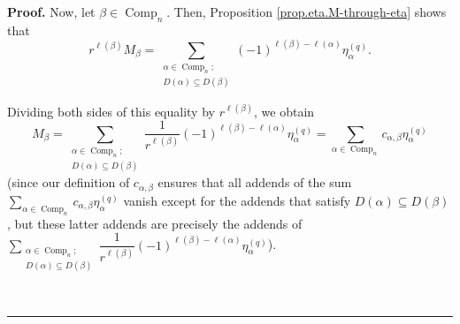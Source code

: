 \documentclass[numbers=enddot,12pt,final,onecolumn,notitlepage]{scrartcl}%
\theoremstyle{definition}
\newenvironment{proof}[1][Proof]{\noindent\textbf{#1.} }{\ \rule{0.5em}{0.5em}}
\let\sumnonlimits\sum
\renewcommand{\sum}{\sumnonlimits\limits}
\newenvironment{vershort}{}{}
\begin{document}
\begin{proof}
Now, let $\beta\in\operatorname*{Comp}\nolimits_{n}$. Then, Proposition
\ref{prop.eta.M-through-eta} shows that%
\begin{equation}
r^{\ell\left(  \beta\right)  }M_{\beta}=\sum_{\substack{\alpha\in
\operatorname*{Comp}\nolimits_{n};\\D\left(  \alpha\right)  \subseteq D\left(
\beta\right)  }}\left(  -1\right)  ^{\ell\left(  \beta\right)  -\ell\left(
\alpha\right)  }\eta_{\alpha}^{\left(  q\right)  }.
\label{pf.prop.etastar-dual-basis.1}%
\end{equation}


\begin{vershort}
\noindent Dividing both sides of this equality by $r^{\ell\left(
\beta\right)  }$, we obtain%
\[
M_{\beta}=\sum_{\substack{\alpha\in\operatorname*{Comp}\nolimits_{n}%
;\\D\left(  \alpha\right)  \subseteq D\left(  \beta\right)  }}\dfrac
{1}{r^{\ell\left(  \beta\right)  }}\left(  -1\right)  ^{\ell\left(
\beta\right)  -\ell\left(  \alpha\right)  }\eta_{\alpha}^{\left(  q\right)
}=\sum_{\alpha\in\operatorname*{Comp}\nolimits_{n}}c_{\alpha,\beta}%
\eta_{\alpha}^{\left(  q\right)  }%
\]
(since our definition of $c_{\alpha,\beta}$ ensures that all addends of the
sum $\sum_{\alpha\in\operatorname*{Comp}\nolimits_{n}}c_{\alpha,\beta}%
\eta_{\alpha}^{\left(  q\right)  }$ vanish except for the addends that satisfy
$D\left(  \alpha\right)  \subseteq D\left(  \beta\right)  $, but these latter
addends are precisely the addends of $\sum_{\substack{\alpha\in
\operatorname*{Comp}\nolimits_{n};\\D\left(  \alpha\right)  \subseteq D\left(
\beta\right)  }}\dfrac{1}{r^{\ell\left(  \beta\right)  }}\left(  -1\right)
^{\ell\left(  \beta\right)  -\ell\left(  \alpha\right)  }\eta_{\alpha
}^{\left(  q\right)  }$).
\end{vershort}


\end{proof}
\end{document}
